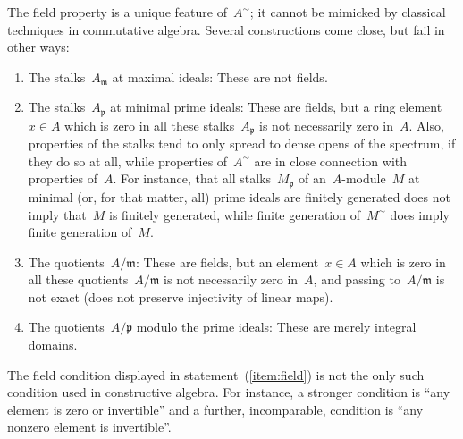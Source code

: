 \documentclass{ws-rv9x6}
\newcommand{\ppp}{\mathfrak{p}}
\newcommand{\mmm}{\mathfrak{m}}
\renewcommand{\_}{\mathpunct{.}}
\newcommand{\?}{\,{:}\,}
\begin{document}
The field property is a unique feature of~$A^\sim$; it cannot be mimicked by
classical techniques in commutative algebra. Several constructions come close,
but fail in other ways:
\begin{enumerate}
\item The stalks~$A_\mmm$ at maximal ideals: These are not fields.
\item The stalks~$A_\ppp$ at minimal prime ideals: These are fields, but a ring
element~$x \in A$ which is zero in all these stalks~$A_\ppp$ is not necessarily
zero in~$A$. Also, properties of the stalks tend to only spread to
dense opens of the spectrum, if they do so at all, while properties of~$A^\sim$
are in close connection with properties of~$A$. For instance, that all
stalks~$M_\ppp$ of an~$A$-module~$M$ at minimal (or, for that matter, all) prime ideals are finitely
generated does not imply that~$M$ is finitely generated, while finite
generation of~$M^\sim$ does imply finite generation of~$M$.
\item The quotients~$A/\mmm$: These are fields, but an element~$x \in A$ which is
zero in all these quotients~$A/\mmm$ is not necessarily zero in~$A$, and
passing to~$A/\mmm$ is not exact (does not preserve injectivity of linear
maps).
\item The quotients~$A/\ppp$ modulo the prime ideals: These are merely integral
domains.
\end{enumerate}

The field condition displayed in statement~(\ref{item:field}) is not the only
such condition used in constructive algebra. For instance, a stronger condition
is ``any element is zero or invertible'' and a further, incomparable, condition
is ``any nonzero element is invertible''.
\end{document}
